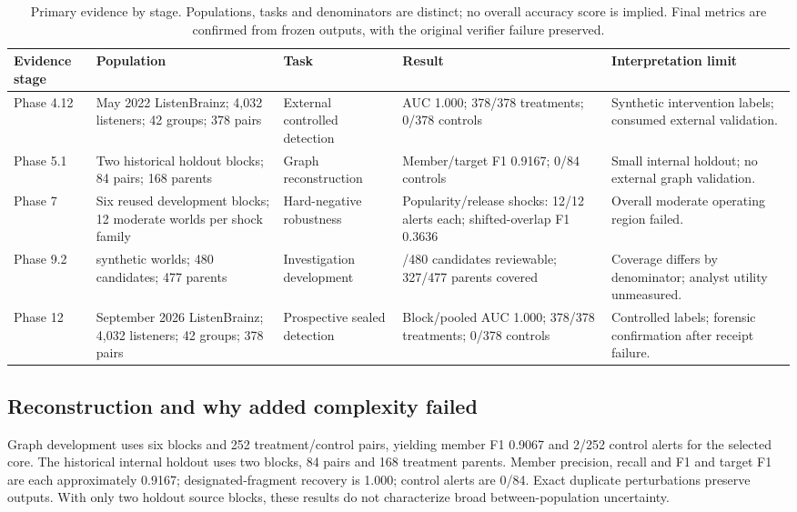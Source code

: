 \documentclass[sigconf,nonacm]{acmart}
\begin{document}
\begin{table}[tbp]\centering\small
\caption{Primary evidence by stage. Populations, tasks and denominators are distinct; no overall accuracy score is implied. Final metrics are confirmed from frozen outputs, with the original verifier failure preserved.}
\renewcommand{\arraystretch}{1.18}\begin{tabularx}{\textwidth}{@{}>{\raggedright\arraybackslash}p{}>{\raggedright\arraybackslash}p{}>{\raggedright\arraybackslash}p{}>{\raggedright\arraybackslash}p{}>{\raggedright\arraybackslash}X@{}}\toprule
Evidence stage & Population & Task & Result & Interpretation limit\\\midrule
Phase 4.12 & May 2022 ListenBrainz; 4,032 listeners; 42 groups; 378 pairs & External controlled detection & AUC 1.000; 378/378 treatments; 0/378 controls & Synthetic intervention labels; consumed external validation.\\
Phase 5.1 & Two historical holdout blocks; 84 pairs; 168 parents & Graph reconstruction & Member/target F1 0.9167; 0/84 controls & Small internal holdout; no external graph validation.\\
Phase 7 & Six reused development blocks; 12 moderate worlds per shock family & Hard-negative robustness & Popularity/release shocks: 12/12 alerts each; shifted-overlap F1 0.3636 & Overall moderate operating region failed.\\
Phase 9.2 & 321 synthetic worlds; 480 candidates; 477 parents & Investigation development & 416/480 candidates reviewable; 327/477 parents covered & Coverage differs by denominator; analyst utility unmeasured.\\
Phase 12 & September 2026 ListenBrainz; 4,032 listeners; 42 groups; 378 pairs & Prospective sealed detection & Block/pooled AUC 1.000; 378/378 treatments; 0/378 controls & Controlled labels; forensic confirmation after receipt failure.\\
\bottomrule\end{tabularx}\label{tab:results}
\end{table}

\subsection{Reconstruction and why added complexity failed}
Graph development uses six blocks and 252 treatment/control pairs, yielding member F1 0.9067 and 2/252 control alerts for the selected core. The historical internal holdout uses two blocks, 84 pairs and 168 treatment parents. Member precision, recall and F1 and target F1 are each approximately 0.9167; designated-fragment recovery is 1.000; control alerts are 0/84. Exact duplicate perturbations preserve outputs. With only two holdout source blocks, these results do not characterize broad between-population uncertainty.
\end{document}
